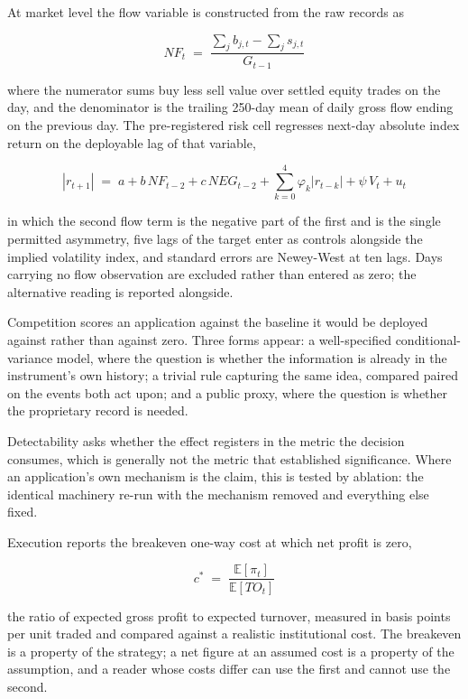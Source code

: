 \documentclass[12pt,a4paper]{article}
\begin{document}
At market level the flow variable is constructed from the raw records as

\begin{equation}
NF_{t} \;=\; \frac{\sum_{j} b_{j,t} - \sum_{j} s_{j,t}}{G_{t-1}}
\end{equation}

where the numerator sums buy less sell value over settled equity trades on the day, and the denominator is the trailing 250-day mean of daily gross flow ending on the previous day. The pre-registered risk cell regresses next-day absolute index return on the deployable lag of that variable,

\begin{equation}
\left|r_{t+1}\right| \;=\; a + b\,NF_{t-2} + c\,NEG_{t-2} + \sum_{k=0}^{4}\varphi_{k}\left|r_{t-k}\right| + \psi\,V_{t} + u_{t}
\end{equation}

in which the second flow term is the negative part of the first and is the single permitted asymmetry, five lags of the target enter as controls alongside the implied volatility index, and standard errors are Newey-West at ten lags. Days carrying no flow observation are excluded rather than entered as zero; the alternative reading is reported alongside.

Competition scores an application against the baseline it would be deployed against rather than against zero. Three forms appear: a well-specified conditional-variance model, where the question is whether the information is already in the instrument's own history; a trivial rule capturing the same idea, compared paired on the events both act upon; and a public proxy, where the question is whether the proprietary record is needed.

Detectability asks whether the effect registers in the metric the decision consumes, which is generally not the metric that established significance. Where an application's own mechanism is the claim, this is tested by ablation: the identical machinery re-run with the mechanism removed and everything else fixed.

Execution reports the breakeven one-way cost at which net profit is zero,

\begin{equation}
c^{\ast} \;=\; \frac{\mathbb{E}\left[\pi_{t}\right]}{\mathbb{E}\left[TO_{t}\right]}
\end{equation}

the ratio of expected gross profit to expected turnover, measured in basis points per unit traded and compared against a realistic institutional cost. The breakeven is a property of the strategy; a net figure at an assumed cost is a property of the assumption, and a reader whose costs differ can use the first and cannot use the second.
\end{document}
